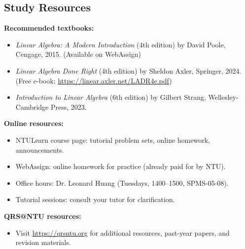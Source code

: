 
\subsection{Study Resources}


\noindent

\textbf{Recommended textbooks:}

\begin{itemize}

\item \textit{Linear Algebra: A Modern Introduction} (4th edition) by David Poole, Cengage, 2015. (Available on WebAssign)

\item \textit{Linear Algebra Done Right} (4th edition) by Sheldon Axler, Springer, 2024. (Free e-book: \url{https://linear.axler.net/LADR4e.pdf})

\item \textit{Introduction to Linear Algebra} (6th edition) by Gilbert Strang, Wellesley-Cambridge Press, 2023.

\end{itemize}

\noindent

\textbf{Online resources:}

\begin{itemize}

\item NTULearn course page: tutorial problem sets, online homework, announcements.

\item WebAssign: online homework for practice (already paid for by NTU).

\item Office hours: Dr. Leonard Huang (Tuesdays, 1400--1500, SPMS-05-08).

\item Tutorial sessions: consult your tutor for clarification.

\end{itemize}

\noindent

\textbf{QRS@NTU resources:}

\begin{itemize}

\item Visit \url{https://qrsntu.org} for additional resources, past-year papers, and revision materials.

\end{itemize}



\newpage
